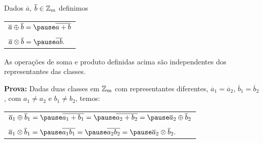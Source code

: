 \documentclass{beamer}
\begin{document}
    \begin{frame}
        \begin{definicao}
            Dados $\overline{a}$, $\overline{b} \in \mathbb{Z}_m$ definimos\pause
            \begin{center}
                \begin{tabular}{l}
                    $\overline{a}\oplus\overline{b} = \pause \overline{a + b}\label{soma_modulo_m}$\pause \\
                    \\
                    $\overline{a}\otimes\overline{b} = \pause \overline{ab}.\label{multiplicacao_modulo_m}$
                \end{tabular}
            \end{center}
        \end{definicao}

        \begin{proposicao}
            As opera{\c c}{\~o}es de soma \pause e produto \pause definidas acima s{\~a}o independentes dos representantes das classes.\pause
        \end{proposicao}
        \noindent \textbf{Prova:}
            Dadas duas classes em $\mathbb{Z}_m$ com representantes diferentes, $\overline{a}_{1} = \overline{a}_{2}$, $\overline{b}_{1} = \overline{b}_{2}$, com $a_{1}\ne a_{2}$ e $b_{1}\ne b_{2}$, temos:
            \begin{center}
                \begin{tabular}{l}
                    $\overline{a}_{1}\oplus \overline{b}_{1} = \pause \overline{a_{1}+b_{1}} = \pause \overline{a_{2} + b_{2}} = \pause \overline{a}_{2}\oplus \overline{b}_{2}$\pause \\
                    \\
                    $\overline{a}_{1}\otimes \overline{b}_{1} = \pause \overline{a_{1}b_{1}} = \pause \overline{a_{2}b_{2}} = \pause \overline{a}_{2}\otimes\overline{b}_{2}.$\pause
                \end{tabular}
            \end{center}
            \qedsymbol
    \end{frame}
\end{document}

